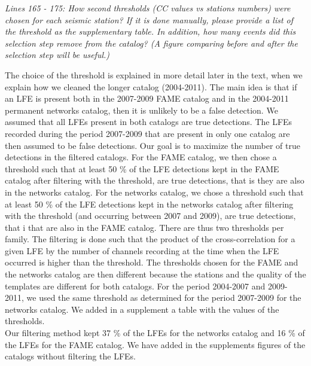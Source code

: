 \documentclass[letterpaper, 12pt]{article}
\begin{document}
\bigskip

\textit{Lines 165 - 175: How second thresholds (CC values vs stations numbers) were chosen for each seismic station? If it is done manually, please provide a list of the threshold as the supplementary table. In addition, how many events did this selection step remove from the catalog? (A figure comparing before and after the selection step will be useful.)}

\bigskip

The choice of the threshold is explained in more detail later in the text, when we explain how we cleaned the longer catalog (2004-2011). The main idea is that if an LFE is present both in the 2007-2009 FAME catalog and in the 2004-2011 permanent networks catalog, then it is unlikely to be a false detection. We assumed that all LFEs present in both catalogs are true detections. The LFEs recorded during the period 2007-2009 that are present in only one catalog are then assumed to be false detections. Our goal is to maximize the number of true detections in the filtered catalogs. For the FAME catalog, we then chose a threshold such that at least 50 \% of the LFE detections kept in the FAME catalog after filtering with the threshold, are true detections, that is they are also in the networks catalog. For the networks catalog, we chose a threshold such that at least 50 \% of the LFE detections kept in the networks catalog after filtering with the threshold (and occurring between 2007 and 2009), are true detections, that i that are also in the FAME catalog. There are thus two thresholds per family. The filtering is done such that the product of the cross-correlation for a given LFE by the number of channels recording at the time when the LFE occurred is higher than the threshold. The thresholds chosen for the FAME and the networks catalog are then different because the stations and the quality of the templates are different for both catalogs. For the period 2004-2007 and 2009-2011, we used the same threshold as determined for the period 2007-2009 for the networks catalog. We added in a supplement a table with the values of the thresholds. \\

Our filtering method kept 37 \% of the LFEs for the networks catalog and 16 \% of the LFEs for the FAME catalog. We have added in the supplements figures of the catalogs without filtering the LFEs.

\bigskip
\end{document}
